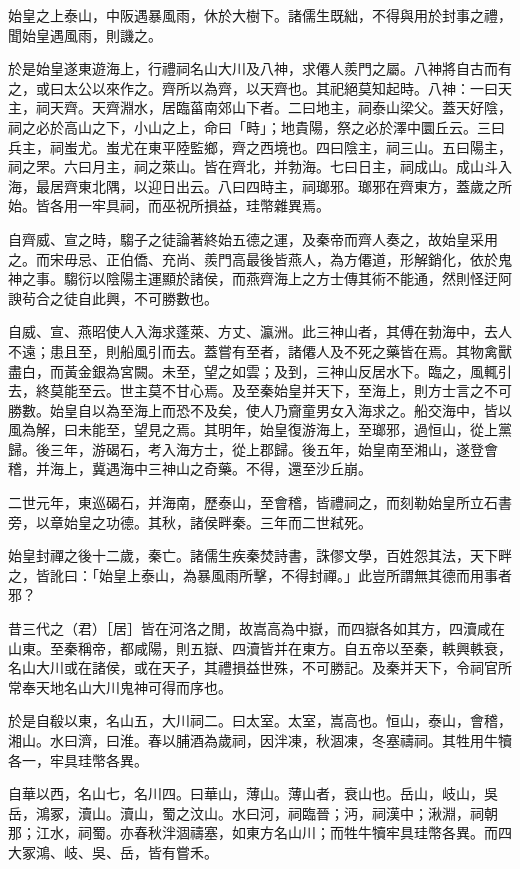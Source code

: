 \begin{pinyinscope}
始皇之上泰山，中阪遇暴風雨，休於大樹下。諸儒生既絀，不得與用於封事之禮，聞始皇遇風雨，則譏之。

於是始皇遂東遊海上，行禮祠名山大川及八神，求僊人羨門之屬。八神將自古而有之，或曰太公以來作之。齊所以為齊，以天齊也。其祀絕莫知起時。八神：一曰天主，祠天齊。天齊淵水，居臨菑南郊山下者。二曰地主，祠泰山梁父。蓋天好陰，祠之必於高山之下，小山之上，命曰「畤」；地貴陽，祭之必於澤中圜丘云。三曰兵主，祠蚩尤。蚩尤在東平陸監鄉，齊之西境也。四曰陰主，祠三山。五曰陽主，祠之罘。六曰月主，祠之萊山。皆在齊北，并勃海。七曰日主，祠成山。成山斗入海，最居齊東北隅，以迎日出云。八曰四時主，祠瑯邪。瑯邪在齊東方，蓋歲之所始。皆各用一牢具祠，而巫祝所損益，珪幣雜異焉。

自齊威、宣之時，騶子之徒論著終始五德之運，及秦帝而齊人奏之，故始皇采用之。而宋毋忌、正伯僑、充尚、羨門高最後皆燕人，為方僊道，形解銷化，依於鬼神之事。騶衍以陰陽主運顯於諸侯，而燕齊海上之方士傳其術不能通，然則怪迂阿諛茍合之徒自此興，不可勝數也。

自威、宣、燕昭使人入海求蓬萊、方丈、瀛洲。此三神山者，其傅在勃海中，去人不遠；患且至，則船風引而去。蓋嘗有至者，諸僊人及不死之藥皆在焉。其物禽獸盡白，而黃金銀為宮闕。未至，望之如雲；及到，三神山反居水下。臨之，風輒引去，終莫能至云。世主莫不甘心焉。及至秦始皇并天下，至海上，則方士言之不可勝數。始皇自以為至海上而恐不及矣，使人乃齎童男女入海求之。船交海中，皆以風為解，曰未能至，望見之焉。其明年，始皇復游海上，至瑯邪，過恒山，從上黨歸。後三年，游碣石，考入海方士，從上郡歸。後五年，始皇南至湘山，遂登會稽，并海上，冀遇海中三神山之奇藥。不得，還至沙丘崩。

二世元年，東巡碣石，并海南，歷泰山，至會稽，皆禮祠之，而刻勒始皇所立石書旁，以章始皇之功德。其秋，諸侯畔秦。三年而二世弒死。

始皇封禪之後十二歲，秦亡。諸儒生疾秦焚詩書，誅僇文學，百姓怨其法，天下畔之，皆訛曰：「始皇上泰山，為暴風雨所擊，不得封禪。」此豈所謂無其德而用事者邪？

昔三代之（君）［居］皆在河洛之閒，故嵩高為中嶽，而四嶽各如其方，四瀆咸在山東。至秦稱帝，都咸陽，則五嶽、四瀆皆并在東方。自五帝以至秦，軼興軼衰，名山大川或在諸侯，或在天子，其禮損益世殊，不可勝記。及秦并天下，令祠官所常奉天地名山大川鬼神可得而序也。

於是自殽以東，名山五，大川祠二。曰太室。太室，嵩高也。恒山，泰山，會稽，湘山。水曰濟，曰淮。春以脯酒為歲祠，因泮凍，秋涸凍，冬塞禱祠。其牲用牛犢各一，牢具珪幣各異。

自華以西，名山七，名川四。曰華山，薄山。薄山者，衰山也。岳山，岐山，吳岳，鴻冢，瀆山。瀆山，蜀之汶山。水曰河，祠臨晉；沔，祠漢中；湫淵，祠朝那；江水，祠蜀。亦春秋泮涸禱塞，如東方名山川；而牲牛犢牢具珪幣各異。而四大冢鴻、岐、吳、岳，皆有嘗禾。


\end{pinyinscope}
